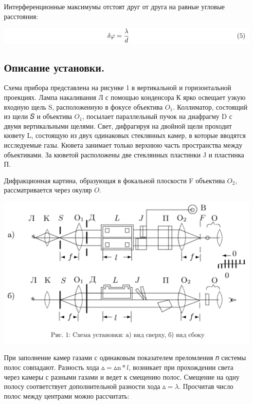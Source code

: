 \documentclass[a4paper,12pt]{article} %
\begin{document}
Интерференционные максимумы отстоят друг от друга на равные угловые расстояния:

\begin{center}
    \includegraphics[scale = 0.4]{eq3}
\end{center}

\subsection{Описание установки.}

Схема прибора представлена на рисунке 1 в вертикальной и горизонтальной проекциях. Лампа накаливания Л с помощью конденсора К ярко освещает узкую входную щель S, расположенную в фокусе объектива $O_1$. Коллиматор, состоящий из
щели 𝑆 и объектива $O_1$, посылает параллельный пучок на диафрагму D с двумя
вертикальными щелями. Свет, дифрагируя на двойной щели проходит кювету L,
состоящую из двух одинаковых стеклянных камер, в которые вводятся исследуемые
газы. Кювета занимает только верхнюю часть пространства между объективами. За
кюветой расположены две стеклянных пластинки J и пластинка П.

Дифракционная картина, образующая в фокальной плоскости F объектива $O_2$,
рассматривается через окуляр $O$.

\begin{center}
    \includegraphics[scale=0.4]{pic1}
\end{center}

При заполнение камер газами с одинаковым показателем преломления 𝑛 системы
полос совпадают. Разность хода $\vartriangle = \vartriangle \text{n} * l$, возникает при прохождении света через
камеры с разными газами и ведет к смещению полос. Смещение на одну полосу
соответствует дополнительной разности хода $\vartriangle = \lambda$. Просчитав число полос между
центрами можно рассчитать:
\end{document}
